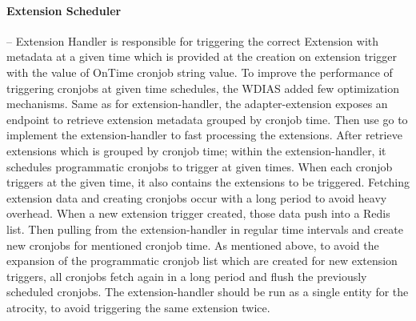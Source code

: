 \paragraph{Extension Scheduler}-- Extension Handler is responsible for triggering the correct Extension with metadata at a given time which is provided at the creation on extension trigger with the value of OnTime cronjob string value. To improve the performance of triggering cronjobs at given time schedules, the WDIAS added few optimization mechanisms.
Same as for extension-handler, the adapter-extension exposes an endpoint to retrieve extension metadata grouped by cronjob time. Then use \acrshort{go} to implement the extension-handler to fast processing the extensions. After retrieve extensions which is grouped by cronjob time; within the extension-handler, it schedules programmatic cronjobs to trigger at given times. When each cronjob triggers at the given time, it also contains the extensions to be triggered. Fetching extension data and creating cronjobs occur with a long period to avoid heavy overhead.
When a new extension trigger created, those data push into a  Redis list. Then pulling from the extension-handler in regular time intervals and create new cronjobs for mentioned cronjob time.
As mentioned above, to avoid the expansion of the programmatic cronjob list which are created for new extension triggers, all cronjobs fetch again in a long period and flush the previously scheduled cronjobs.
The extension-handler should be run as a single entity for the atrocity, to avoid triggering the same extension twice.